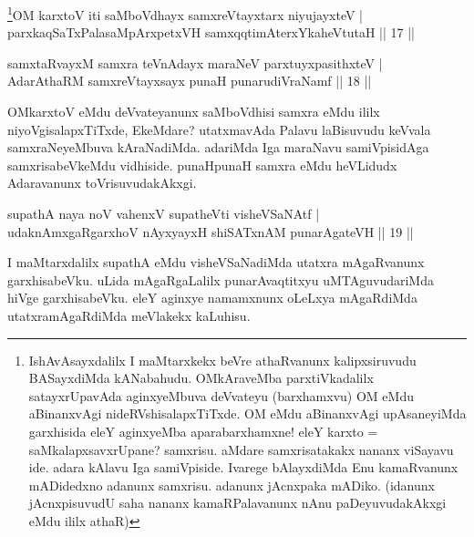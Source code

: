 \begin{shl}
\footnote{IshAvAsayxdalilx I maMtarxkekx beVre athaRvanunx 
kalipxsiruvudu BASayxdiMda kANabahudu. OMkAraveMba parxtiVkadalilx 
satayxrUpavAda aginxyeMbuva deVvateyu (barxhamxvu) OM eMdu aBinanxvAgi 
nideRVshisalapxTiTxde. OM eMdu aBinanxvAgi upAsaneyiMda garxhisida 
eleY aginxyeMba aparabarxhamxne! eleY karxto = saMkalapxsavxrUpane? 
samxrisu. aMdare samxrisatakakx nananx viSayavu ide. adara kAlavu Iga 
samiVpiside. Ivarege bAlayxdiMda Enu kamaRvanunx mADidedxno adanunx 
samxrisu. adanunx jAcnxpaka mADiko. (idanunx jAcnxpisuvudU saha nananx 
kamaRPalavanunx nAnu paDeyuvudakAkxgi eMdu ililx athaR)}OM karxtoV iti saMboVdhayx samxreVtayxtarx niyujayxteV | \\
parxkaqSaTxPalasaMpArxpetxVH samxqqtimAterxYkaheVtutaH \hfill||  17 || 
\end{shl}

\begin{shl}
samxtaRvayxM samxra teVnAdayx maraNeV parxtuyxpasithxteV | \\
AdarAthaRM samxreVtayxsayx punaH punarudiVraNamf \hfill||  18 || 
\end{shl}

\begin{artha} 
OMkarxtoV eMdu deVvateyanunx saMboVdhisi samxra eMdu ililx 
niyoVgisalapxTiTxde, EkeMdare? utatxmavAda Palavu laBisuvudu keVvala 
samxraNeyeMbuva kAraNadiMda. adariMda Iga maraNavu samiVpisidAga 
samxrisabeVkeMdu vidhiside. punaHpunaH samxra eMdu heVLidudx 
Adaravanunx toVrisuvudakAkxgi.
\end{artha}


\begin{shl}
supathA naya noV vahenxV supatheVti visheVSaNAtf | \\
udaknAmxgaRgarxhoV nAyxyayxH shiSATxnAM punarAgateVH \hfill||  19 || 
\end{shl}

\begin{artha} 
I maMtarxdalilx supathA eMdu visheVSaNadiMda utatxra mAgaRvanunx 
garxhisabeVku. uLida mAgaRgaLalilx punarAvaqtitxyu uMTAguvudariMda 
hiVge garxhisabeVku. eleY aginxye namamxnunx oLeLxya mAgaRdiMda 
utatxramAgaRdiMda meVlakekx kaLuhisu.
\end{artha}


